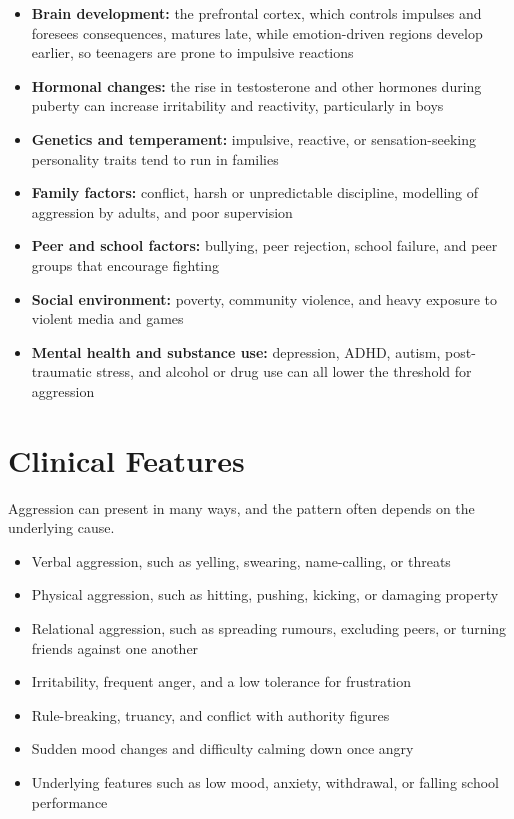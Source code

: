 \begin{itemize}
    \item \textbf{Brain development:} the prefrontal cortex, which controls impulses and foresees consequences, matures late, while emotion-driven regions develop earlier, so teenagers are prone to impulsive reactions
    \item \textbf{Hormonal changes:} the rise in testosterone and other hormones during puberty can increase irritability and reactivity, particularly in boys
    \item \textbf{Genetics and temperament:} impulsive, reactive, or sensation-seeking personality traits tend to run in families
    \item \textbf{Family factors:} conflict, harsh or unpredictable discipline, modelling of aggression by adults, and poor supervision
    \item \textbf{Peer and school factors:} bullying, peer rejection, school failure, and peer groups that encourage fighting
    \item \textbf{Social environment:} poverty, community violence, and heavy exposure to violent media and games
    \item \textbf{Mental health and substance use:} depression, ADHD, autism, post-traumatic stress, and alcohol or drug use can all lower the threshold for aggression
\end{itemize}

\section*{Clinical Features}
Aggression can present in many ways, and the pattern often depends on the underlying cause.

\begin{itemize}
    \item Verbal aggression, such as yelling, swearing, name-calling, or threats
    \item Physical aggression, such as hitting, pushing, kicking, or damaging property
    \item Relational aggression, such as spreading rumours, excluding peers, or turning friends against one another
    \item Irritability, frequent anger, and a low tolerance for frustration
    \item Rule-breaking, truancy, and conflict with authority figures
    \item Sudden mood changes and difficulty calming down once angry
    \item Underlying features such as low mood, anxiety, withdrawal, or falling school performance
\end{itemize}

